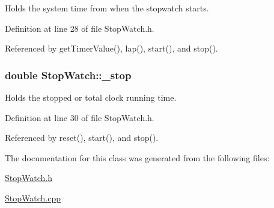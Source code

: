 Holds the system time from when the stopwatch starts. 



Definition at line 28 of file Stop\-Watch.\-h.



Referenced by get\-Timer\-Value(), lap(), start(), and stop().

\hypertarget{classStopWatch_a553fb52b9dc9a4c3f1a388f31ae4d4bf}{
\subsubsection[{\-\_\-stop}]{\setlength{\rightskip}{0pt plus 5cm}double Stop\-Watch\-::\-\_\-stop\hspace{0.3cm}{\ttfamily [private]}}}\label{classStopWatch_a553fb52b9dc9a4c3f1a388f31ae4d4bf}


Holds the stopped or total clock running time. 



Definition at line 30 of file Stop\-Watch.\-h.



Referenced by reset(), start(), and stop().



The documentation for this class was generated from the following files\-:\begin{DoxyCompactItemize}
\item 
\hyperlink{StopWatch_8h}{Stop\-Watch.\-h}\item 
\hyperlink{StopWatch_8cpp}{Stop\-Watch.\-cpp}\end{DoxyCompactItemize}
